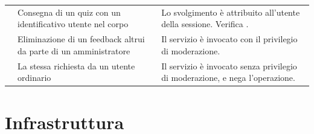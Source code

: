 \begin{longtable}{@{}l L{5.0cm} L{7.4cm}@{}}
 & Consegna di un quiz con un identificativo utente nel corpo &
  Lo svolgimento è attribuito all'utente della sessione. Verifica
  . \\

 & Eliminazione di un feedback altrui da parte di un
  amministratore & Il servizio è invocato con il privilegio di moderazione. \\

 & La stessa richiesta da un utente ordinario &
  Il servizio è invocato senza privilegio di moderazione, e nega
  l'operazione. \\

\end{longtable}

\section{Infrastruttura}

